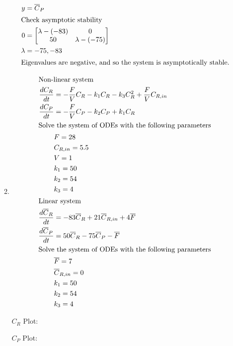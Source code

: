 \documentclass[12pt]{article}
\begin{document}
\begin{enumerate}
\begin{enumerate}
\begin{align*}
        y &= \overline{C}_P \\
        \intertext{Check asymptotic stability}
        0 &= \begin{bmatrix}
            \lambda-(-83) & 0 \\
            50 & \lambda-(-75) \\
        \end{bmatrix} \\
        \lambda &= -75, -83 \\
        \intertext{Eigenvalues are negative, and so the system is asymptotically stable.}
    \end{align*}
    \item 
    \begin{align*}
        \intertext{Non-linear system}
        \frac{dC_R}{dt} &= -\frac{F}{V} C_R - k_1 C_R - k_3 C_R^2 + \frac{F}{V} C_{R,in} \\
        \frac{dC_P}{dt} &= -\frac{F}{V} C_P - k_2 C_P + k_1 C_R \\
        \intertext{Solve the system of ODEs with the following parameters}
        & F = 28 \\
        & C_{R,in} = 5.5 \\
        & V = 1 \\
        & k_1 = 50 \\
        & k_2 = 54 \\
        & k_3 = 4 \\
        \intertext{Linear system}
        \frac{d\overline{C}_R}{dt} &= -83 \overline{C}_R + 21 \overline{C}_{R,in} + 4 \overline{F} \\
        \frac{d\overline{C}_P}{dt} &= 50 \overline{C}_R - 75 \overline{C}_P - \overline{F} \\
        \intertext{Solve the system of ODEs with the following parameters}
        & \overline{F} = 7 \\
        & \overline{C}_{R,in} = 0 \\
        & k_1 = 50 \\
        & k_2 = 54 \\
        & k_3 = 4 \\
    \end{align*}

    $C_R$ Plot:

    \begin{center}
        
    \end{center}

    $C_P$ Plot:


\end{enumerate}
\end{enumerate}
\end{document}
